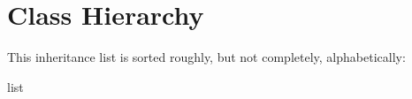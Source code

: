 \section{Class Hierarchy}
This inheritance list is sorted roughly, but not completely, alphabetically\+:\begin{DoxyCompactList}
\item {}
\item list\begin{DoxyCompactList}
\item {}
\end{DoxyCompactList}
\item {}
\item {}
\end{DoxyCompactList}
